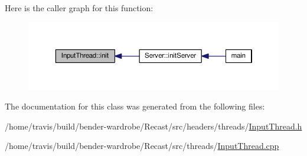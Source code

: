 Here is the caller graph for this function\-:
\nopagebreak
\begin{figure}[H]
\begin{center}
\leavevmode
\includegraphics[width=350pt]{class_input_thread_ac33f0f934c6dc40c7747b96e8b60a736_icgraph}
\end{center}
\end{figure}




The documentation for this class was generated from the following files\-:\begin{DoxyCompactItemize}
\item 
/home/travis/build/bender-\/wardrobe/\-Recast/src/headers/threads/\hyperlink{_input_thread_8h}{Input\-Thread.\-h}\item 
/home/travis/build/bender-\/wardrobe/\-Recast/src/threads/\hyperlink{_input_thread_8cpp}{Input\-Thread.\-cpp}\end{DoxyCompactItemize}
